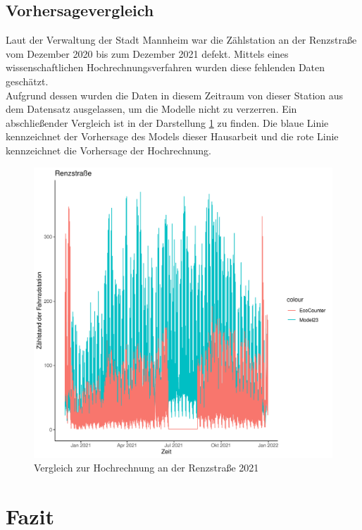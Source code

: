 \documentclass[a4paper,12pt]{thesis}
\begin{document}
\section{Vorhersagevergleich}

Laut der Verwaltung der Stadt Mannheim war die Zählstation an der Renzstraße vom Dezember 2020 bis zum Dezember 2021 defekt. Mittels eines wissenschaftlichen Hochrechnungsverfahren wurden diese fehlenden Daten geschätzt.\\ 
Aufgrund dessen wurden die Daten in diesem Zeitraum von dieser Station aus dem Datensatz ausgelassen, um die Modelle nicht zu verzerren. Ein abschließender Vergleich ist in der Darstellung \ref{Forecast2} zu finden. Die blaue Linie kennzeichnet der Vorhersage des Models dieser Hausarbeit und die rote Linie kennzeichnet die Vorhersage der Hochrechnung.


\begin{figure}[!ht]
	\centering
	\includegraphics[width=\textwidth]{Plots/Renzstrasse.pdf}
	\caption{Vergleich zur Hochrechnung an der Renzstraße 2021}
	\label{Forecast2}
\end{figure}

\chapter{Fazit}
\end{document}
